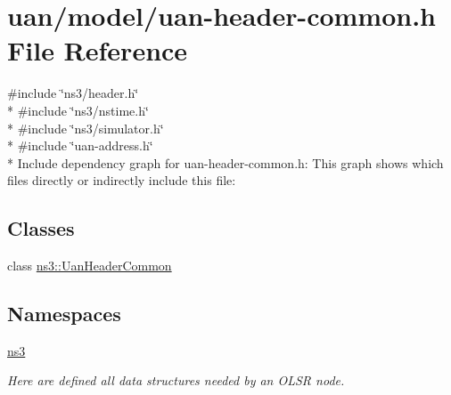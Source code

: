 \hypertarget{uan-header-common_8h}{}\section{uan/model/uan-\/header-\/common.h File Reference}
\label{uan-header-common_8h}
{\ttfamily \#include \char`\"{}ns3/header.\+h\char`\"{}}\\*
{\ttfamily \#include \char`\"{}ns3/nstime.\+h\char`\"{}}\\*
{\ttfamily \#include \char`\"{}ns3/simulator.\+h\char`\"{}}\\*
{\ttfamily \#include \char`\"{}uan-\/address.\+h\char`\"{}}\\*
Include dependency graph for uan-\/header-\/common.h\+:
This graph shows which files directly or indirectly include this file\+:
\subsection*{Classes}
\begin{DoxyCompactItemize}
\item 
class \hyperlink{classns3_1_1UanHeaderCommon}{ns3\+::\+Uan\+Header\+Common}
\end{DoxyCompactItemize}
\subsection*{Namespaces}
\begin{DoxyCompactItemize}
\item 
 \hyperlink{namespacens3}{ns3}
\begin{DoxyCompactList}\small\item\em Here are defined all data structures needed by an O\+L\+SR node. \end{DoxyCompactList}\end{DoxyCompactItemize}
